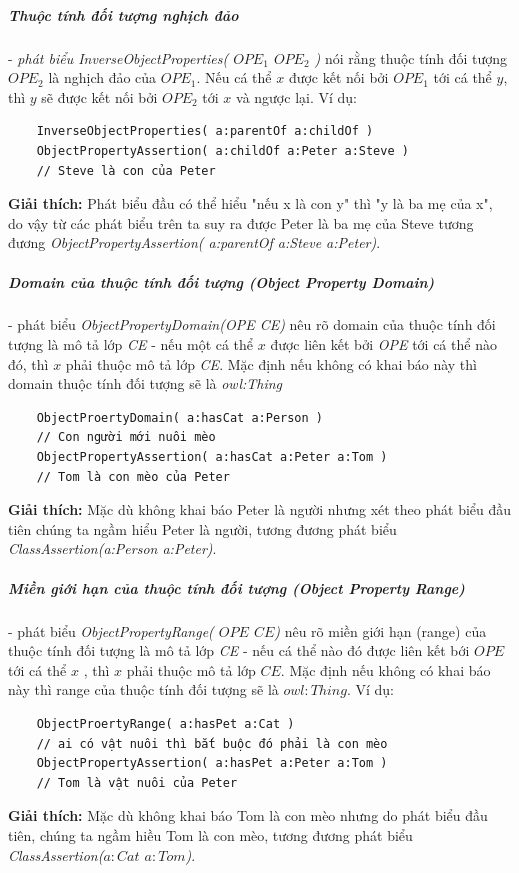 	\subparagraph{Thuộc tính đối tượng nghịch đảo} - \textit{phát biểu InverseObjectProperties( $OPE_{1}$ $OPE_{2}$ )} nói rằng thuộc tính đối tượng $OPE_{2}$ là nghịch đảo của $OPE_{1}$. Nếu cá thể $x$ được kết nối bởi $OPE_{1}$ tới cá thể $y$, thì $y$ sẽ được kết nối bởi $OPE_{2}$ tới $x$ và ngược lại. Ví dụ:
	\begin{verbatim}
	InverseObjectProperties( a:parentOf a:childOf )
	ObjectPropertyAssertion( a:childOf a:Peter a:Steve ) 
	// Steve là con của Peter
	\end{verbatim}
	\textbf{Giải thích:} Phát biểu đầu có thể hiểu "nếu x là con y" thì "y là ba mẹ của x", do vậy từ các phát biểu trên ta suy ra được Peter là ba mẹ của Steve tương đương \textit{ObjectPropertyAssertion( a:parentOf a:Steve a:Peter)}.
	
	\subparagraph{Domain của thuộc tính đối tượng (Object Property Domain)} - phát biểu \textit{ObjectPropertyDomain(OPE CE)} nêu rõ domain của thuộc tính đối tượng là mô tả lớp \textit{CE} -  nếu một cá thể $x$ được liên kết bởi \textit{OPE} tới cá thể nào đó, thì $x$ phải thuộc mô tả lớp \textit{CE}. Mặc định nếu không có khai báo này thì domain thuộc tính đối tượng sẽ là \textit{owl:Thing}
	\begin{verbatim}
	ObjectProertyDomain( a:hasCat a:Person ) 
	// Con người mới nuôi mèo
	ObjectPropertyAssertion( a:hasCat a:Peter a:Tom ) 
	// Tom là con mèo của Peter
	\end{verbatim}
	\textbf{Giải thích:} Mặc dù không khai báo Peter là người nhưng xét theo phát biểu đầu tiên chúng ta ngầm hiểu Peter là người, tương đương phát biểu \textit{ClassAssertion(a:Person a:Peter)}.
	
	\subparagraph{Miền giới hạn của thuộc tính đối tượng (Object Property Range)} - phát biểu \textit{ObjectPropertyRange( $OPE$ $CE$)} nêu rõ miền giới hạn (range) của thuộc tính đối tượng là mô tả lớp \textit{CE} -  nếu cá thể nào đó được liên kết bới $OPE$ tới cá thể $x$ , thì $x$ phải thuộc mô tả lớp $CE$. Mặc định nếu không có khai báo này thì range của thuộc tính đối tượng sẽ là $owl:Thing$. Ví dụ:
	\begin{verbatim}
	ObjectProertyRange( a:hasPet a:Cat ) 
	// ai có vật nuôi thì bắt buộc đó phải là con mèo
	ObjectPropertyAssertion( a:hasPet a:Peter a:Tom ) 
	// Tom là vật nuôi của Peter
	\end{verbatim}
	\textbf{Giải thích:} Mặc dù không khai báo Tom là con mèo nhưng do phát biểu đầu tiên, chúng ta ngầm hiều Tom là con mèo, tương đương phát biểu \textit{ClassAssertion($a:Cat$ $a:Tom$)}.
	
